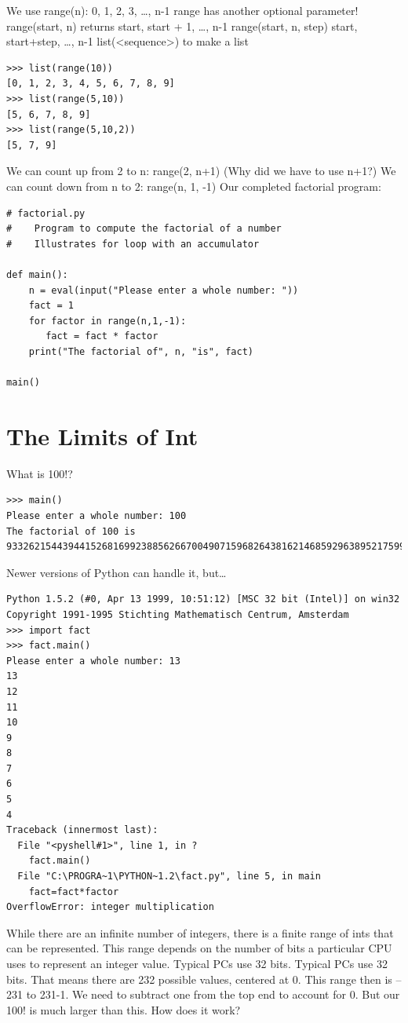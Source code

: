 \documentclass[12pt,a4paper,final,twoside,titlepage]{book}
\begin{document}
We use range(n):
0, 1, 2, 3, …, n-1
range has another optional parameter! range(start, n) returns
start, start + 1, …, n-1
range(start, n, step)
start, start+step, …, n-1
list(<sequence>) to make a list
\lstset{language=Python, tabsize=4}
\begin{lstlisting}
>>> list(range(10))
[0, 1, 2, 3, 4, 5, 6, 7, 8, 9]
>>> list(range(5,10))
[5, 6, 7, 8, 9]
>>> list(range(5,10,2))
[5, 7, 9]
\end{lstlisting}
We can count up from 2 to n:
range(2, n+1)
(Why did we have to use n+1?)
We can count down from n to 2:
range(n, 1, -1)
Our completed factorial program:
\lstset{language=Python, tabsize=4}
\begin{lstlisting}
# factorial.py
#    Program to compute the factorial of a number
#    Illustrates for loop with an accumulator

def main():
    n = eval(input("Please enter a whole number: "))
    fact = 1
    for factor in range(n,1,-1): 
       fact = fact * factor
    print("The factorial of", n, "is", fact)

main()
\end{lstlisting}
\section{The Limits of Int}
What is 100!?
\lstset{language=Python, tabsize=4}
\begin{lstlisting}
>>> main()
Please enter a whole number: 100
The factorial of 100 is 93326215443944152681699238856266700490715968264381621468592963895217599993229915608941463976156518286253697920827223758251185210916864000000000000000000000000
\end{lstlisting}
Newer versions of Python can handle it, but…
\lstset{language=Python, tabsize=4}
\begin{lstlisting}
Python 1.5.2 (#0, Apr 13 1999, 10:51:12) [MSC 32 bit (Intel)] on win32
Copyright 1991-1995 Stichting Mathematisch Centrum, Amsterdam
>>> import fact
>>> fact.main()
Please enter a whole number: 13
13
12
11
10
9
8
7
6
5
4
Traceback (innermost last):
  File "<pyshell#1>", line 1, in ?
    fact.main()
  File "C:\PROGRA~1\PYTHON~1.2\fact.py", line 5, in main
    fact=fact*factor
OverflowError: integer multiplication
\end{lstlisting}
While there are an infinite number of integers, there is a finite range of ints that can be represented. This range depends on the number of bits a particular CPU uses to represent an integer value. Typical PCs use 32 bits. Typical PCs use 32 bits. That means there are 232 possible values, centered at 0. This range then is –231 to 231-1. We need to subtract one from the top end to account for 0. But our 100! is much larger than this. How does it work?
\end{document}
